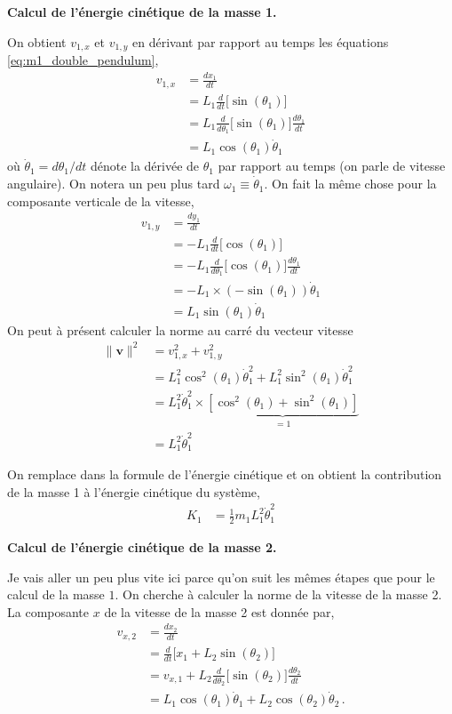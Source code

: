 \documentclass[titlepage]{article}
\theoremstyle{cleanremark}
\begin{document}
\noindent \textbf{Calcul de l'énergie cinétique de la masse 1.}

\noindent On obtient $v_{1,x}$ et $v_{1,y}$ en dérivant par rapport au temps les équations \cref{eq:m1_double_pendulum},
\begin{align}
    v_{1,x} &= \frac{d x_1}{dt} \\
    &= L_1\frac{d}{dt}\bigg[\sin (\theta_1)\bigg]
    \\
    &= L_1\frac{d }{d\theta_1}\bigg[\sin(\theta_1) \bigg]\frac{d\theta_1}{dt}
    \\
    &=L_1\cos(\theta_1)\dot{\theta}_1
\end{align}
où $\dot{\theta}_1=d\theta_1/dt$ dénote la dérivée de $\theta_1$ par rapport au temps (on parle de vitesse angulaire). On notera un peu plus tard $\omega_1\equiv \dot{\theta}_1$. On fait la même chose pour la composante verticale de la vitesse, 
\begin{align}
    v_{1,y} &= \frac{d y_1}{dt}
    \\
    &= -L_1\frac{d}{dt}\bigg[\cos(\theta_1)\bigg]
    \\
    &= -L_1 \frac{d}{d \theta_1}\bigg[\cos(\theta_1)\bigg]\frac{d \theta_1}{dt}
    \\
    &=-L_1\times (-\sin(\theta_1)) \dot{\theta}_1
    \\
    &=L_1 \sin(\theta_1)\dot{\theta}_1
\end{align}
On peut à présent calculer la norme au carré du vecteur vitesse
\begin{align}
    \lVert \mathbf{v}\rVert^2 &= v^2_{1,x} + v^2_{1,y}
    \\
    &= L_1^2\cos^2(\theta_1)\dot{\theta}_1^2 + L_1^2\sin^2(\theta_1)\dot{\theta}_1^2
    \\
    &=L_1^2\dot{\theta}_1^2\times \underbrace{[\cos^2(\theta_1) + \sin^2(\theta_1)]}_{=1}
    \\
    &= L_1^2\dot{\theta}_1^2
\end{align}

On remplace dans la formule de l'énergie cinétique et on obtient la contribution de la masse 1 à l'énergie cinétique du système, 
\begin{align}
    K_1 &= \frac{1}{2}m_1L_1^2 \dot{\theta}_1^2
\end{align}

\noindent \textbf{Calcul de l'énergie cinétique de la masse 2.}


\noindent Je vais aller un peu plus vite ici parce qu'on suit les mêmes étapes que pour le calcul de la masse $1$. 
On cherche à calculer la norme de la vitesse de la masse 2. La composante $x$ de la vitesse de la masse 2 est donnée par,
\begin{align}
    v_{x, 2} &= \frac{dx_2}{dt}\\
    &=\frac{d}{dt}\bigg[x_1 +  L_2\sin(\theta_2)\bigg]
    \\
    &=v_{x,1}+L_2\frac{d}{d\theta_2}\bigg[\sin(\theta_2)\bigg]\frac{d\theta_2}{dt}
    \\
    &=L_1\cos(\theta_1)\dot{\theta}_1 + L_2\cos(\theta_2)\dot{\theta}_2\, .
\end{align}
\end{document}
